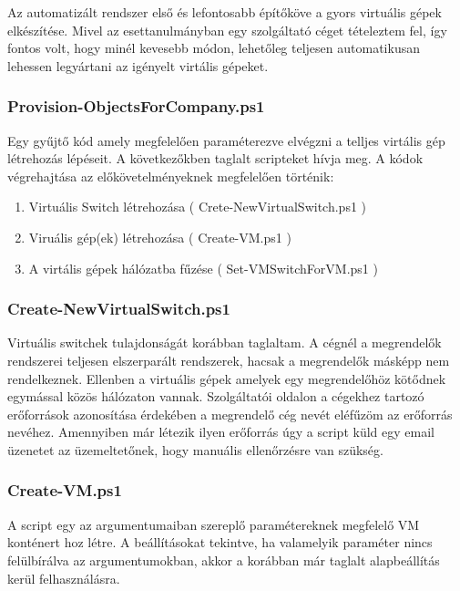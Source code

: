 \documentclass[12pt,oneside,justify]{book}
\begin{document}
Az automatizált rendszer első és lefontosabb építőköve a gyors virtuális gépek elkészítése. Mivel az esettanulmányban egy szolgáltató céget tételeztem fel, így fontos volt, hogy minél kevesebb módon, lehetőleg teljesen automatikusan lehessen legyártani az igényelt virtális gépeket. 

\subsubsection{Provision-ObjectsForCompany.ps1}
Egy gyűjtő kód amely megfelelően paraméterezve elvégzni a telljes virtális gép létrehozás lépéseit. 
A következőkben taglalt scripteket hívja meg. 
A kódok végrehajtása az előkövetelményeknek megfelelően történik:
\begin{enumerate}
	\item Virtuális Switch létrehozása ( Crete-NewVirtualSwitch.ps1 )
	\item Viruális gép(ek) létrehozása ( Create-VM.ps1 )
	\item A virtális gépek hálózatba fűzése ( Set-VMSwitchForVM.ps1 )
\end{enumerate}


\subsubsection{Create-NewVirtualSwitch.ps1}

Virtuális switchek tulajdonságát korábban taglaltam. A cégnél a megrendelők rendszerei teljesen elszerparált rendszerek, hacsak a megrendelők másképp nem rendelkeznek. Ellenben a virtuális gépek amelyek egy megrendelőhöz kötődnek egymással közös hálózaton vannak. Szolgáltatói oldalon a cégekhez tartozó erőforrások azonosítása érdekében a megrendelő cég nevét eléfűzöm az erőforrás nevéhez. Amennyiben már létezik ilyen erőforrás úgy a script küld egy email üzenetet az üzemeltetőnek, hogy manuális ellenőrzésre van szükség.


\subsubsection{Create-VM.ps1}

A script egy az argumentumaiban szereplő paramétereknek megfelelő VM konténert hoz létre. A beállításokat tekintve, ha valamelyik paraméter nincs felülbírálva az argumentumokban, akkor a korábban már taglalt alapbeállítás kerül felhasználásra.
\end{document}
